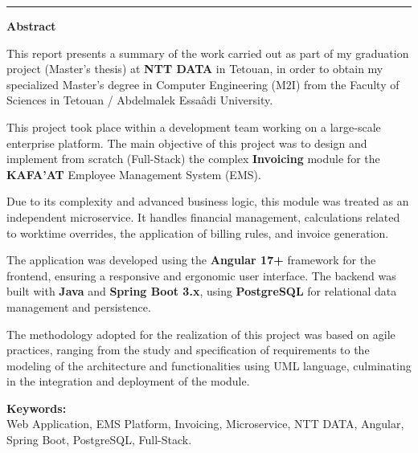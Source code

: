 \documentclass[12pt, a4paper, openany]{report}
\begin{document}
\vspace{0.0cm}

\vspace{0.1cm}


\newpage
\thispagestyle{frontmatter} 

\vspace*{0.5cm} 

\noindent
\textcolor{royalBlue}{\rule{0.65\textwidth}{1pt}}
\hfill
{\fontsize{24}{28}\selectfont\color{royalBlue}\bfseries Abstract}

\vspace{0.0cm}

\begin{large}
\setlength{\parskip}{0.3cm} %
\renewcommand{\baselinestretch}{1.3}\selectfont %

This report presents a summary of the work carried out as part of my graduation project (Master's thesis) at \textbf{NTT DATA} in Tetouan, in order to obtain my specialized Master's degree in Computer Engineering (M2I) from the Faculty of Sciences in Tetouan / Abdelmalek Essaâdi University.

This project took place within a development team working on a large-scale enterprise platform. The main objective of this project was to design and implement from scratch (Full-Stack) the complex \textbf{Invoicing} module for the \textbf{KAFA'AT} Employee Management System (EMS).

Due to its complexity and advanced business logic, this module was treated as an independent microservice. It handles financial management, calculations related to worktime overrides, the application of billing rules, and invoice generation.

The application was developed using the \textbf{Angular 17+} framework for the frontend, ensuring a responsive and ergonomic user interface. The backend was built with \textbf{Java} and \textbf{Spring Boot 3.x}, using \textbf{PostgreSQL} for relational data management and persistence.

The methodology adopted for the realization of this project was based on agile practices, ranging from the study and specification of requirements to the modeling of the architecture and functionalities using UML language, culminating in the integration and deployment of the module.

\vspace{0cm}

\noindent\textbf{Keywords:} \\
Web Application, EMS Platform, Invoicing, Microservice, NTT DATA, Angular, Spring Boot, PostgreSQL, Full-Stack.

\end{large}
\end{document}
